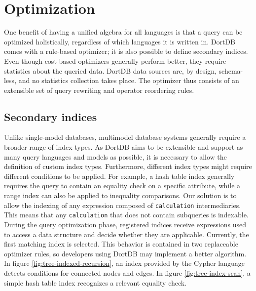 \chapter{Optimization}
\label{chap:optimization}

One benefit of having a unified algebra for all languages is that a query can be optimized holistically, regardless of which languages it is written in. DortDB comes with a rule-based optimizer; it is also possible to define secondary indices. Even though cost-based optimizers generally perform better, they require statistics about the queried data. DortDB data sources are, by design, schema-less, and no statistics collection takes place. The optimizer thus consists of an extensible set of query rewriting and operator reordering rules.

\section{Secondary indices}
\label{sec:indices}

Unlike single-model databases, multimodel database systems generally require a broader range of index types\cite{mihal2023refining}. As DortDB aims to be extensible and support as many query languages and models as possible, it is necessary to allow the definition of custom index types. Furthermore, different index types might require different conditions to be applied. For example, a hash table index generally requires the query to contain an equality check on a specific attribute, while a range index can also be applied to inequality comparisons. Our solution is to allow the indexing of any expression composed of \texttt{calculation} intermediaries. This means that any \texttt{calculation} that does not contain subqueries is indexable. During the query optimization phase, registered indices receive expressions used to access a data structure and decide whether they are applicable. Currently, the first matching index is selected. This behavior is contained in two replaceable optimizer rules, so developers using DortDB may implement a better algorithm. In figure \ref{fig:tree-indexed-recursion}, an index provided by the Cypher language detects conditions for connected nodes and edges. In figure \ref{fig:tree-index-scan}, a simple hash table index recognizes a relevant equality check.

